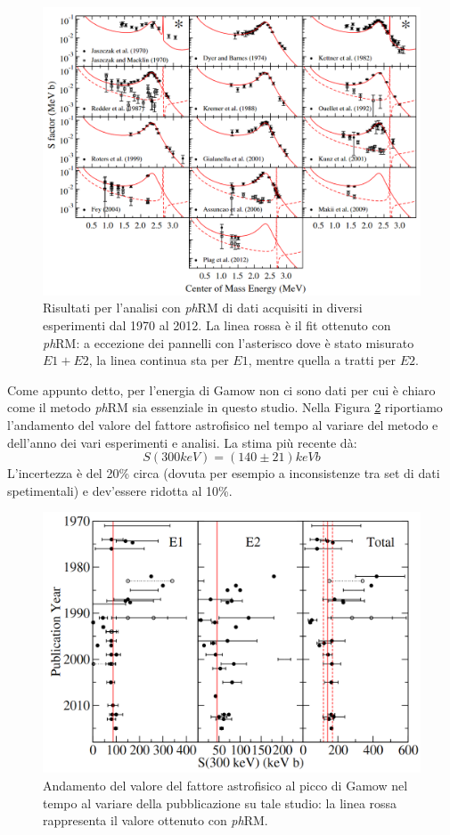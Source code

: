 \begin{figure}[!h]
	\centering
	\includegraphics[scale=0.5]{Immagini/0426_SE.png}
	\caption{Risultati per l'analisi con \textit{ph}RM di dati acquisiti in diversi esperimenti dal 1970 al 2012. La linea rossa è il fit ottenuto con \textit{ph}RM: a eccezione dei pannelli con l'asterisco dove è stato misurato $E1+E2$, la linea continua sta per $E1$, mentre quella a tratti per $E2$.}
	\label{0426_Se}
\end{figure}

\noindent Come appunto detto, per l'energia di Gamow non ci sono dati per cui è chiaro come il metodo \textit{ph}RM sia essenziale in questo studio. Nella Figura \ref{0426_storia} riportiamo l'andamento del valore del fattore astrofisico nel tempo al variare del metodo e dell'anno dei vari esperimenti e analisi. La stima più recente dà:
$$S(300\unit{keV}) = (140\pm 21)\unit{keV b}$$
L'incertezza è del 20\% circa (dovuta per esempio a inconsistenze tra set di dati spetimentali) e dev'essere ridotta al 10\%.

\begin{figure}[!h]
	\centering
	\includegraphics[scale=0.4]{Immagini/0426_storia.png}
	\caption{Andamento del valore del fattore astrofisico al picco di Gamow nel tempo al variare della pubblicazione su tale studio: la linea rossa rappresenta il valore ottenuto con \textit{ph}RM.}
	\label{0426_storia}
\end{figure}

